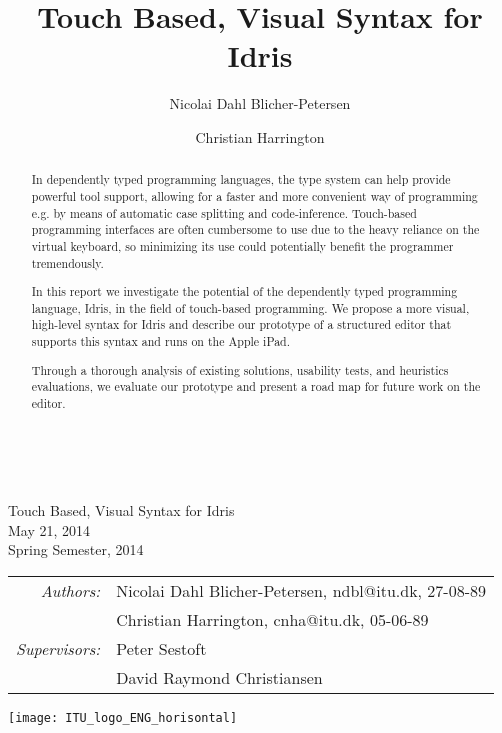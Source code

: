 \documentclass[a4paper,11pt]{report}
\begin{document}
\title{Touch Based, Visual Syntax for Idris}
\author{Nicolai Dahl Blicher-Petersen \and Christian Harrington \\
}


\begin{titlepage}
\ \\
\vspace{3cm}
\begin{center}
{\huge\sffamily
Touch Based, Visual Syntax for Idris
\\}\bigskip
{\large\sffamily
May 21, 2014
\\}
{\sffamily Spring Semester, 2014}
\end{center}
\vspace{3cm}
\large
\begin{center}
\begin{tabular}{r@{  }l}
\emph{\sffamily Authors:} & \textsf{Nicolai Dahl Blicher-Petersen, ndbl@itu.dk, 27-08-89}\\
 & \textsf{Christian Harrington, cnha@itu.dk, 05-06-89}\\
\emph{\sffamily Supervisors:} & \textsf{Peter Sestoft} \\
 & \textsf{David Raymond Christiansen}
\end{tabular}
\end{center}
\vfill
\texttt{[image: ITU\_logo\_ENG\_horisontal]}
\end{titlepage}


\begin{abstract}
In dependently typed programming languages, the type system can help provide powerful tool support, allowing for a faster and more
convenient way of programming e.g. by means of automatic case splitting and code-inference. Touch-based programming interfaces are often
cumbersome to use due to the heavy reliance on the virtual keyboard, so
minimizing its use could potentially benefit the programmer tremendously.

In this report we investigate the potential of the dependently typed
programming language, Idris, in the field of touch-based programming.
We propose a more visual, high-level syntax for Idris and describe our prototype of a structured editor
that supports this syntax and runs on the Apple iPad.

Through a thorough analysis of existing solutions, usability tests, and
heuristics evaluations, we evaluate our prototype and present a road map for
future work on the editor.


\tableofcontents

\listoffigures

\end{abstract}
\end{document}
